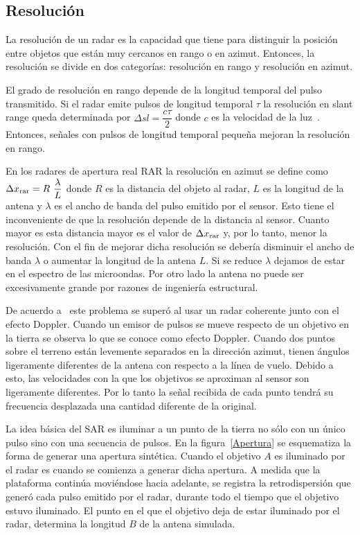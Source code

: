 \subsection{Resolución}

La resolución de un radar es la capacidad que tiene para distinguir la posición entre objetos que están muy cercanos en rango o en azimut. Entonces, la resolución se divide en dos categorías: resolución en rango y resolución en azimut. 

El grado de resolución en rango depende de la longitud temporal del pulso transmitido. Si el radar emite pulsos de longitud temporal $\tau$ la resolución en slant range queda determinada por $\Delta sl= \dfrac{c \tau}{2}$ donde $c$ es la velocidad de la luz~\cite{Sarmap2009,Moreira2013}. Entonces, señales con pulsos de longitud temporal pequeña mejoran la resolución en rango.

En los radares de apertura real RAR la resolución en azimut se define como $\Delta x_{\tiny \text{rar}}= R \ \dfrac{\lambda}{L}$ donde $R$ es la distancia del objeto al radar, $L$ es la longitud de la antena y $\lambda$ es el ancho de banda del pulso emitido por el sensor. Esto tiene el inconveniente de que la resolución depende de la distancia al sensor. Cuanto mayor es esta distancia mayor es el valor de $\Delta x_{\tiny \text{rar}}$ y, por lo tanto, menor la resolución. Con el fin de mejorar dicha resolución se debería disminuir el ancho de banda $\lambda$ o aumentar la longitud de la antena $L$. Si se reduce $\lambda$ dejamos de estar en el espectro de las microondas. Por otro lado la antena no puede ser excesivamente grande por razones de ingeniería estructural.

De acuerdo a~\cite{Moreira2013} este problema se superó al usar un radar coherente junto con el efecto Doppler. Cuando un emisor de pulsos se mueve respecto de un objetivo en la tierra se observa lo que se conoce como efecto Doppler. Cuando dos puntos sobre el terreno están levemente separados en la dirección azimut, tienen ángulos ligeramente diferentes de la antena con respecto a la línea de vuelo. Debido a esto, las velocidades con la que los objetivos se aproximan al sensor son ligeramente diferentes. Por lo tanto la señal recibida de cada punto tendrá su frecuencia desplazada una cantidad diferente de la original. 

La idea básica del SAR es iluminar a un punto de la tierra no sólo con un único pulso sino con una secuencia de pulsos. En la figura~\ref{Apertura} se esquematiza la forma de generar una apertura sintética. Cuando el objetivo $A$ es iluminado por el radar es cuando se comienza a generar dicha apertura. A medida que la plataforma continúa moviéndose hacia adelante, se registra la retrodispersión que generó cada pulso emitido por el radar, durante todo el tiempo que el objetivo estuvo iluminado. El punto en el que el objetivo deja de estar iluminado por el radar, determina la longitud $B$ de la antena simulada. 

